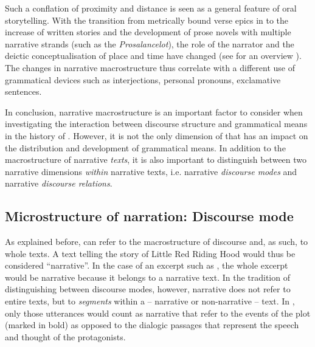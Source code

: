\documentclass[output=paper,colorlinks,citecolor=brown]{langscibook}
\begin{document}
Such a conflation of proximity and distance is seen as a general feature of oral storytelling. With the transition from metrically bound verse epics in  to the increase of written stories and the development of prose novels with multiple narrative strands (such as the \textit{Prosalancelot}), the role of the narrator and the deictic conceptualisation of place and time have changed (see for an overview \citealt{Zeman2023b}). The changes in narrative macrostructure thus correlate with a different use of grammatical devices such as interjections, personal pronouns, exclamative sentences.

In conclusion, narrative macrostructure is an important factor to consider when investigating the interaction between discourse structure and grammatical means in the history of . However, it is not the only dimension of  that has an impact on the distribution and development of grammatical means. In addition to the macrostructure of narrative \textit{texts}, it is also important to distinguish between two narrative dimensions \textit{within} narrative texts, i.e. narrative \textit{discourse modes} and narrative \textit{discourse relations}. 


\subsection{Microstructure of narration: Discourse mode}\label{sec:zeman:2.2}
As explained before,  can refer to the macrostructure of discourse and, as such, to whole texts. A text telling the story of Little Red Riding Hood would thus be considered “narrative”. In the case of an excerpt such as , the whole excerpt would be narrative because it belongs to a narrative text. In the tradition of distinguishing between discourse modes, however, narrative does not refer to entire texts, but to \textit{segments} within a – narrative or non-narrative – text. In , only those utterances would count as narrative that refer to the events of the plot (marked in bold) as opposed to the dialogic passages that represent the speech and thought of the protagonists.
\end{document}
